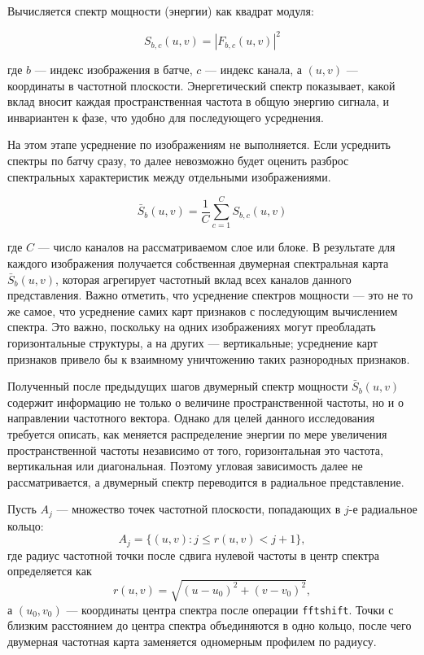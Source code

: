 Вычисляется спектр мощности (энергии) как квадрат модуля:

\begin{equation}
    S_{b,c}(u, v) = |F_{b,c}(u, v)|^2
\end{equation}

где $b$ — индекс изображения в батче, $c$ — индекс канала, а $(u,v)$ — координаты в частотной плоскости. Энергетический спектр показывает, какой вклад вносит каждая пространственная частота в общую энергию сигнала, и инвариантен к фазе, что удобно для последующего усреднения.

На этом этапе усреднение по изображениям не выполняется. Если усреднить спектры по батчу сразу, то далее невозможно будет оценить разброс спектральных характеристик между отдельными изображениями.

\begin{equation}
    \bar{S}_{b}(u, v) = \frac{1}{C} \sum_{c=1}^{C} S_{b,c}(u, v)
\end{equation}

где $C$ — число каналов на рассматриваемом слое или блоке. В результате для каждого изображения получается собственная двумерная спектральная карта $\bar{S}_{b}(u,v)$, которая агрегирует частотный вклад всех каналов данного представления. Важно отметить, что усреднение спектров мощности — это не то же самое, что усреднение самих карт признаков с последующим вычислением спектра. Это важно, поскольку на одних изображениях могут преобладать горизонтальные структуры, а на других — вертикальные; усреднение карт признаков привело бы к взаимному уничтожению таких разнородных признаков. 

Полученный после предыдущих шагов двумерный спектр мощности $\bar{S}_{b}(u,v)$ содержит информацию не только о величине пространственной частоты, но и о направлении частотного вектора. Однако для целей данного исследования требуется описать, как меняется распределение энергии по мере увеличения пространственной частоты независимо от того, горизонтальная это частота, вертикальная или диагональная. Поэтому угловая зависимость далее не рассматривается, а двумерный спектр переводится в радиальное представление.

Пусть $A_j$ — множество точек частотной плоскости, попадающих в $j$-е радиальное кольцо:
\begin{equation}
A_j = \{(u,v): j \leq r(u,v) < j+1\},
\end{equation}
где радиус частотной точки после сдвига нулевой частоты в центр спектра определяется как
\begin{equation}
r(u,v)=\sqrt{(u-u_0)^2 + (v-v_0)^2},
\end{equation}
а $(u_0,v_0)$ — координаты центра спектра после операции \texttt{fftshift}. Точки с близким расстоянием до центра спектра объединяются в одно кольцо, после чего двумерная частотная карта заменяется одномерным профилем по радиусу.

